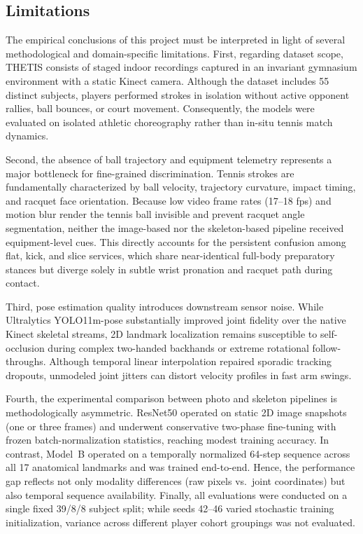 \documentclass[12pt,a4paper]{article}
\begin{document}
\clearpage
\subsection{Limitations}
The empirical conclusions of this project must be interpreted in light of several methodological and domain-specific limitations. First, regarding dataset scope, THETIS consists of staged indoor recordings captured in an invariant gymnasium environment with a static Kinect camera. Although the dataset includes 55 distinct subjects, players performed strokes in isolation without active opponent rallies, ball bounces, or court movement. Consequently, the models were evaluated on isolated athletic choreography rather than in-situ tennis match dynamics.

Second, the absence of ball trajectory and equipment telemetry represents a major bottleneck for fine-grained discrimination. Tennis strokes are fundamentally characterized by ball velocity, trajectory curvature, impact timing, and racquet face orientation. Because low video frame rates (17--18 fps) and motion blur render the tennis ball invisible and prevent racquet angle segmentation, neither the image-based nor the skeleton-based pipeline received equipment-level cues. This directly accounts for the persistent confusion among flat, kick, and slice services, which share near-identical full-body preparatory stances but diverge solely in subtle wrist pronation and racquet path during contact.

Third, pose estimation quality introduces downstream sensor noise. While Ultralytics YOLO11m-pose substantially improved joint fidelity over the native Kinect skeletal streams, 2D landmark localization remains susceptible to self-occlusion during complex two-handed backhands or extreme rotational follow-throughs. Although temporal linear interpolation repaired sporadic tracking dropouts, unmodeled joint jitters can distort velocity profiles in fast arm swings.

Fourth, the experimental comparison between photo and skeleton pipelines is methodologically asymmetric. ResNet50 operated on static 2D image snapshots (one or three frames) and underwent conservative two-phase fine-tuning with frozen batch-normalization statistics, reaching modest training accuracy. In contrast, Model~B operated on a temporally normalized 64-step sequence across all 17 anatomical landmarks and was trained end-to-end. Hence, the performance gap reflects not only modality differences (raw pixels vs.\ joint coordinates) but also temporal sequence availability. Finally, all evaluations were conducted on a single fixed 39/8/8 subject split; while seeds 42--46 varied stochastic training initialization, variance across different player cohort groupings was not evaluated.
\end{document}
